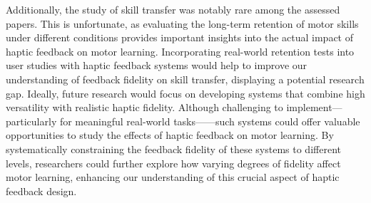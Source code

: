 Additionally, the study of skill transfer was notably rare among the assessed papers. This is unfortunate, as evaluating the long-term retention of motor skills under different conditions provides important insights into the actual impact of haptic feedback on motor learning. Incorporating real-world retention tests into user studies with haptic feedback systems would help to improve our understanding of feedback fidelity on skill transfer, displaying a potential research gap.
Ideally, future research would focus on developing systems that combine high versatility with realistic haptic fidelity. Although challenging to implement---particularly for meaningful real-world tasks—---such systems could offer valuable opportunities to study the effects of haptic feedback on motor learning. By systematically constraining the feedback fidelity of these systems to different levels, researchers could further explore how varying degrees of fidelity affect motor learning, enhancing our understanding of this crucial aspect of haptic feedback design.
